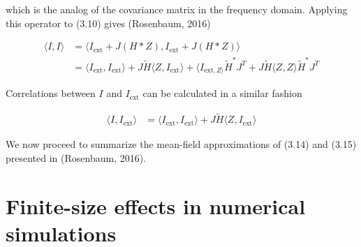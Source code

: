 \documentclass{ucetd}
\begin{document}
which is the analog of the covariance matrix in the frequency domain. Applying this operator to (3.10) gives (Rosenbaum, 2016)

\begin{align}
\langle I, I \rangle &= \langle I_{\mathrm{ext}} + J(H*Z), I_{\mathrm{ext}} + J(H*Z) \rangle\\
&= \langle I_{\mathrm{ext}}, I_{\mathrm{ext}}\rangle  + J\tilde{H}\langle Z, I_{\mathrm{ext}} \rangle + \langle I_{\mathrm{ext}, Z\rangle}\tilde{H}^{*}J^{T} + J\tilde{H}\langle Z, Z\rangle \tilde{H}^{*}J^{T}
\end{align}

Correlations between $I$ and $I_{\mathrm{ext}}$ can be calculated in a similar fashion

\begin{align}
\langle I, I_{\mathrm{ext}} \rangle &= \langle I_{\mathrm{ext}}, I_{\mathrm{ext}}\rangle + J\tilde{H} \langle Z, I_{\mathrm{ext}}\rangle
\end{align}

We now proceed to summarize the mean-field approximations of (3.14) and (3.15) presented in (Rosenbaum, 2016). 

\section{Finite-size effects in numerical simulations}
\end{document}
